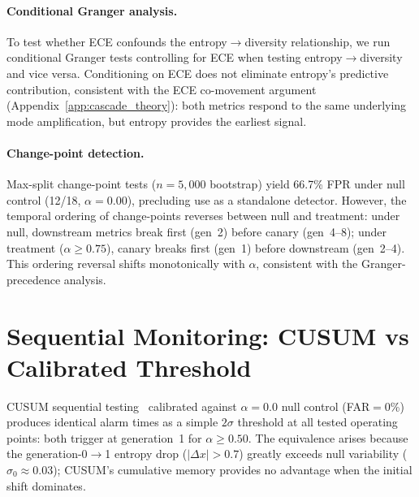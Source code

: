 \paragraph{Conditional Granger analysis.}
To test whether ECE confounds the entropy$\to$diversity relationship, we run conditional Granger tests controlling for ECE when testing entropy$\to$diversity and vice versa.
Conditioning on ECE does not eliminate entropy's predictive contribution, consistent with the ECE co-movement argument (Appendix~\ref{app:cascade_theory}): both metrics respond to the same underlying mode amplification, but entropy provides the earliest signal.

\label{app:change_point}
\paragraph{Change-point detection.}
Max-split change-point tests ($n{=}5{,}000$ bootstrap) yield 66.7\% FPR under null control (12/18, $\alpha{=}0.00$), precluding use as a standalone detector.
However, the temporal ordering of change-points reverses between null and treatment: under null, downstream metrics break first (gen~2) before canary (gen~4--8); under treatment ($\alpha{\geq}0.75$), canary breaks first (gen~1) before downstream (gen~2--4).
This ordering reversal shifts monotonically with $\alpha$, consistent with the Granger-precedence analysis.


\section{Sequential Monitoring: CUSUM vs Calibrated Threshold}
\label{app:csmp}

CUSUM sequential testing~\citep{page1954continuous} calibrated against $\alpha{=}0.0$ null control (FAR${=}$0\%) produces identical alarm times as a simple $2\sigma$ threshold at all tested operating points: both trigger at generation~1 for $\alpha{\geq}0.50$.
The equivalence arises because the generation-0$\to$1 entropy drop ($|\Delta x|{>}0.7$) greatly exceeds null variability ($\sigma_0{\approx}0.03$); CUSUM's cumulative memory provides no advantage when the initial shift dominates.

